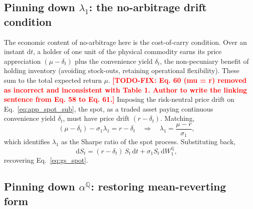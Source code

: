 \documentclass[11pt, a4paper]{article}
\newcommand{\convyield}{\delta}             %
\newcommand{\longrun}{\alpha}               %
\begin{document}
\subsection{Pinning down \texorpdfstring{$\lambda_1$}{lambda1}: the no-arbitrage drift condition}

The economic content of no-arbitrage here is the cost-of-carry condition. Over an instant $\mathrm{d}t$, a holder of one unit of the physical commodity earns its price appreciation $(\mu - \convyield_t)$ plus the convenience yield $\convyield_t$, the non-pecuniary benefit of holding inventory (avoiding stock-outs, retaining operational flexibility). These sum to the total expected return $\mu$. \textcolor{red}{\textbf{[TODO-FIX: Eq. 60 (mu = r) removed as incorrect and inconsistent with Table 1. Author to write the linking sentence from Eq. 58 to Eq. 61.]}}
\noindent
Imposing the risk-neutral price drift on Eq.~\ref{eq:app_spot_sub}, the spot, as a traded asset paying continuous convenience yield $\convyield_t$, must have price drift $(r - \convyield_t)$. Matching,
\begin{equation}
  \label{eq:app_lambda1}
  (\mu - \convyield_t) - \sigma_1\lambda_1 = r - \convyield_t
  \quad\Longrightarrow\quad
  \lambda_1 = \frac{\mu - r}{\sigma_1},
\end{equation}
\noindent
which identifies $\lambda_1$ as the Sharpe ratio of the spot process. Substituting back,
\begin{equation}
  \label{eq:app_spot_Q}
  \mathrm{d}S_t = (r - \convyield_t)\,S_t\,\mathrm{d}t + \sigma_1 S_t\,\mathrm{d}W_1^{\mathbb{Q}},
\end{equation}
\noindent
recovering Eq.~\ref{eq:gs_spot}.

\subsection{Pinning down \texorpdfstring{$\longrun^{\mathbb{Q}}$}{alphaQ}: restoring mean-reverting form}
\end{document}
